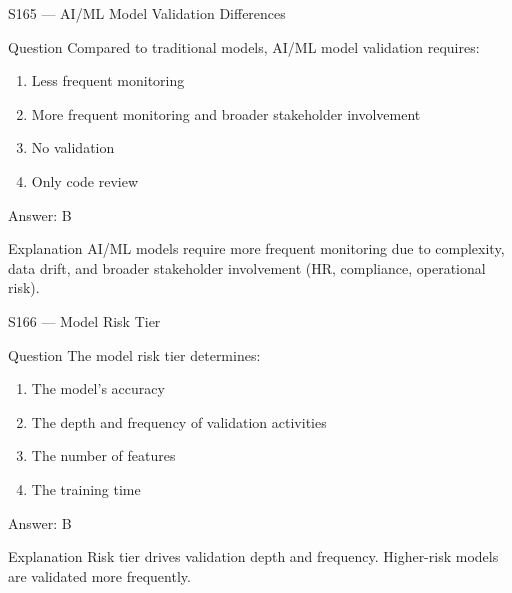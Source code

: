 \documentclass[aspectratio=169,8pt]{beamer}
\begin{document}
	\begin{frame}{S165 --- AI/ML Model Validation Differences}
		\begin{block}{Question}
			Compared to traditional models, AI/ML model validation requires:
			\begin{enumerate}
				\item Less frequent monitoring
				\item More frequent monitoring and broader stakeholder involvement
				\item No validation
				\item Only code review
			\end{enumerate}
		\end{block}
		\begin{exampleblock}{Answer: B}\end{exampleblock}
		\begin{block}{Explanation}
			AI/ML models require more frequent monitoring due to complexity, data drift, and broader stakeholder involvement (HR, compliance, operational risk).
		\end{block}
	\end{frame}
	
	\begin{frame}{S166 --- Model Risk Tier}
		\begin{block}{Question}
			The model risk tier determines:
			\begin{enumerate}
				\item The model's accuracy
				\item The depth and frequency of validation activities
				\item The number of features
				\item The training time
			\end{enumerate}
		\end{block}
		\begin{exampleblock}{Answer: B}\end{exampleblock}
		\begin{block}{Explanation}
			Risk tier drives validation depth and frequency. Higher-risk models are validated more frequently.
		\end{block}
	\end{frame}
	
\end{document}
